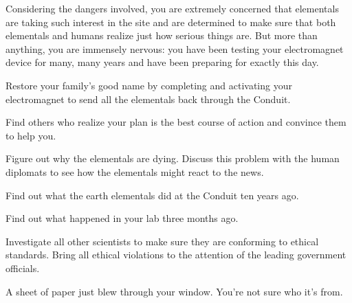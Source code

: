 \documentclass[char]{elementals}
\begin{document}
Considering the dangers involved, you are extremely concerned that elementals are taking such interest in the site and are determined to make sure that both elementals and humans realize just how serious things are. But more than anything, you are immensely nervous: you have been testing your electromagnet device for many, many years and have been preparing for exactly this day.



\begin{itemz}[Goals]
  \item Restore your family's good name by completing and activating your electromagnet to send all the elementals back through the Conduit.
  \item Find others who realize your plan is the best course of action and convince them to help you. %
  \item Figure out why the elementals are dying. Discuss this problem with the human diplomats to see how the elementals might react to the news.
  \item Find out what the earth elementals did at the Conduit ten years ago.
  \item Find out what happened in your lab three months ago.
  \item Investigate all other scientists to make sure they are conforming to ethical standards. Bring all ethical violations to the attention of the leading government officials.
\end{itemz}

\begin{itemz}[Notes]
\item A sheet of paper just blew through your window. You're not sure who it's from.
\end{itemz}
\end{document}
